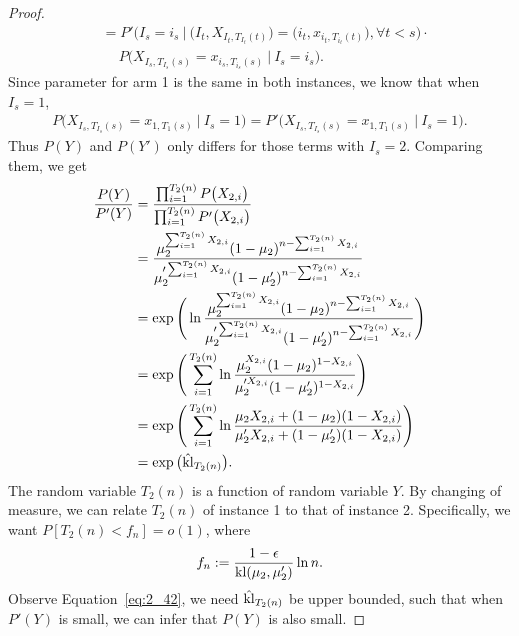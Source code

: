\begin{proof}
\begin{equation}
\begin{split}
            &=P'\Big(I_s=i_s~\Big|~
            \big(I_t, X_{I_t, T_{I_t}(t)}\big)=\big(i_t, x_{i_t, T_{i_t}(t)}\big), \forall t<s\Big) \cdot \\
            &\quad~P\Big(X_{I_s, T_{I_s}(s)}=x_{i_s, T_{i_s}(s)}~\Big|~I_s=i_s\Big).
        \end{split}
    \end{equation}
    Since parameter for arm 1 is the same in both instances, we know that when $I_s=1$,
    \begin{align}
        P\Big(X_{I_s, T_{I_s}(s)}=x_{1, T_{1}(s)}~\Big|~I_s=1\Big) = P'\Big(X_{I_s, T_{I_s}(s)}=x_{1, T_{1}(s)}~\Big|~I_s=1\Big).
    \end{align}
    Thus $P(Y)$ and $P(Y')$ only differs for those terms with $I_s=2$.
    Comparing them, we get
    \begin{align}
        \frac{P(Y)}{P'(Y)}
            &= \frac{\prod_{i=1}^{T_2(n)}P\big(X_{2, i}\big)}{\prod_{i=1}^{T_2(n)}P'\big(X_{2, i}\big)} \\
            &= \frac{\mu_2^{\sum_{i=1}^{T_2(n)} X_{2,i}}(1-\mu_2)^{n-\sum_{i=1}^{T_2(n)} X_{2,i}}}
                {\mu_2'^{\sum_{i=1}^{T_2(n)} X_{2,i}}(1-\mu_2')^{n-\sum_{i=1}^{T_2(n)} X_{2,i}}} \\
            &= \exp\Bigg(\ln
                \frac{\mu_2^{\sum_{i=1}^{T_2(n)} X_{2,i}}(1-\mu_2)^{n-\sum_{i=1}^{T_2(n)} X_{2,i}}}
                {\mu_2'^{\sum_{i=1}^{T_2(n)} X_{2,i}}(1-\mu_2')^{n-\sum_{i=1}^{T_2(n)} X_{2,i}}}\Bigg) \\
            &= \exp\Bigg(\sum_{i=1}^{T_2(n)} \ln
                \frac{\mu_2^{X_{2,i}}(1-\mu_2)^{1-X_{2,i}}}
                {\mu_2'^{X_{2,i}}(1-\mu_2')^{1-X_{2,i}}}\Bigg) \\
            &= \exp\Bigg(\sum_{i=1}^{T_2(n)} \ln
                \frac{\mu_2 X_{2,i} + (1-\mu_2) (1-X_{2,i})}
                {\mu_2' X_{2,i} + (1-\mu_2')(1-X_{2,i})}\Bigg) \\
            &= \exp\big(\hat{{\mathop{\mathrm{kl}}}}_{T_2(n)}\big).\label{eq:2_42}
    \end{align}
    The random variable $T_2(n)$ is a function of random variable $Y$.
    By changing of measure,
    we can relate $T_2(n)$ of instance 1 to that of instance 2.
    Specifically, we want $P[T_2(n)<f_n]=o(1)$, where
    \begin{equation}
        f_n:=\frac{1-\epsilon}{{\mathop{\mathrm{kl}}}(\mu_2,\mu_2')}\ln n.
    \end{equation}
    Observe Equation~\eqref{eq:2_42}, we need $\hat{{\mathop{\mathrm{kl}}}}_{T_2(n)}$ be upper bounded,
    such that when $P'(Y)$ is small, we can infer that $P(Y)$ is also small.

\end{proof}
